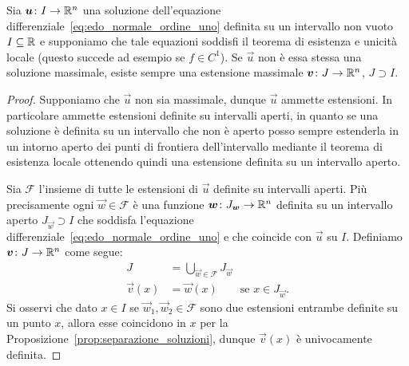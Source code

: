\begin{theorem}
\label{th:edo_esistenza_massimali}
Sia $\boldsymbol u\colon I\to \mathbb R^n$ una soluzione dell'equazione differenziale~\eqref{eq:edo_normale_ordine_uno}
definita su un intervallo non vuoto $I\subseteq \mathbb R$
e supponiamo che tale equazioni soddisfi il teorema di esistenza e unicità locale (questo succede ad esempio se $f\in C^1$).
Se $\vec u$ non è essa stessa una soluzione massimale, esiste
sempre una estensione massimale $\boldsymbol v\colon J\to \mathbb R^n$, $J\supset I$.
\end{theorem}
%
\begin{proof}
Supponiamo che $\vec u$ non sia massimale, dunque $\vec u$ ammette estensioni. In particolare ammette estensioni definite su intervalli aperti, in quanto se una soluzione è definita su un intervallo che non è aperto posso sempre estenderla in un intorno aperto dei punti di frontiera dell'intervallo mediante il teorema di esistenza locale ottenendo quindi una estensione definita su un intervallo aperto.

Sia $\mathcal F$ l'insieme di tutte le estensioni di $\vec u$ definite su intervalli aperti. Più precisamente ogni $\vec w\in \mathcal F$ è una funzione $\boldsymbol w\colon J_{\boldsymbol w}\to \mathbb R^n$ definita su un intervallo aperto $J_{\vec w}\supset I$ che soddisfa l'equazione differenziale~\eqref{eq:edo_normale_ordine_uno} e che coincide con $\vec u$ su $I$. Definiamo $\boldsymbol v\colon J\to\mathbb R^n$ come segue:
\begin{align*}
J &= \bigcup_{\vec w \in \mathcal F} J_{\vec w}\\
\vec v(x) &= \vec w(x) \qquad\text{se $x\in J_{\vec w}$}.
\end{align*}
Si osservi che dato $x\in I$ se $\vec w_1, \vec w_2\in\mathcal F$ sono due estensioni entrambe definite su un punto $x$, allora esse coincidono in $x$ per la Proposizione~\ref{prop:separazione_soluzioni}, dunque $\vec v(x)$ è univocamente definita.


\end{proof}
